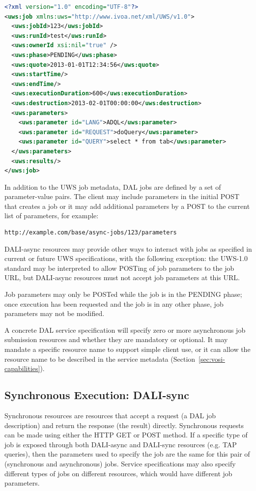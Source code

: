 \documentclass[11pt,letter]{ivoa}
\begin{document}
\begin{lstlisting}[language=XML,basicstyle=\footnotesize]
<?xml version="1.0" encoding="UTF-8"?>
<uws:job xmlns:uws="http://www.ivoa.net/xml/UWS/v1.0">
  <uws:jobId>123</uws:jobId>
  <uws:runId>test</uws:runId>
  <uws:ownerId xsi:nil="true" />
  <uws:phase>PENDING</uws:phase>
  <uws:quote>2013-01-01T12:34:56</uws:quote>
  <uws:startTime/>
  <uws:endTime/>
  <uws:executionDuration>600</uws:executionDuration>
  <uws:destruction>2013-02-01T00:00:00</uws:destruction>
  <uws:parameters>
    <uws:parameter id="LANG">ADQL</uws:parameter>
    <uws:parameter id="REQUEST">doQuery</uws:parameter>
    <uws:parameter id="QUERY">select * from tab</uws:parameter>
  </uws:parameters>
  <uws:results/>
</uws:job>
\end{lstlisting}

In addition to the UWS job metadata, DAL jobs are defined by a set of
parameter-value pairs. The client may include parameters in the initial POST
that creates a job or it may add additional parameters by a POST to the current
list of parameters, for example:

\begin{verbatim}
http://example.com/base/async-jobs/123/parameters
\end{verbatim}

DALI-async resources may provide other ways to interact with jobs as specified
in current or future UWS specifications, with the following exception: the
UWS-1.0 standard may be interpreted to allow POSTing of job parameters to the
job URL, but DALI-async resources must not accept job parameters at this URL.

Job parameters may only be POSTed while the job is in the PENDING phase; once
execution has been requested and the job is in any other phase, job parameters
may not be modified.

A concrete DAL service specification will specify zero or more asynchronous job
submission resources and whether they are mandatory or optional. It may mandate
a specific resource name to support simple client use, or it can allow the
resource name to be described in the service metadata (Section~\ref{sec:vosi-capabilities}).

\subsection{Synchronous Execution: DALI-sync}
\label{sec:dali-sync}
Synchronous resources are resources that accept a request (a DAL job
description) and return the response (the result) directly. Synchronous requests
can be made using either the HTTP GET or POST method. If a specific type of job
is exposed through both DALI-async and DALI-sync resources (e.g. TAP queries),
then the parameters used to specify the job are the same for  this pair of
(synchronous and asynchronous) jobs. Service specifications may also specify
different types of jobs on different resources, which would have different job
parameters.
\end{document}
